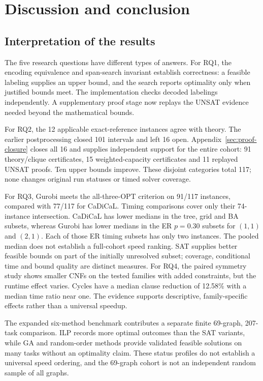 \section{Discussion and conclusion}
\subsection{Interpretation of the results}
The five research questions have different types of answers.
For RQ1, the encoding equivalence and span-search invariant establish
correctness: a feasible labeling supplies an upper bound, and the search
reports optimality only when justified bounds meet. The implementation
checks decoded labelings independently. A supplementary proof stage now
replays the UNSAT evidence needed beyond the mathematical bounds.

For RQ2, the 12 applicable exact-reference instances agree with theory.
The earlier postprocessing closed 101 intervals and left 16 open.
Appendix~\ref{sec:proof-closure} closes all 16 and supplies independent
support for the entire cohort: 91 theory/clique certificates, 15
weighted-capacity certificates and 11 replayed UNSAT proofs. Ten upper
bounds improve. These disjoint categories total 117; none changes
original run statuses or timed solver coverage.

For RQ3, Gurobi meets the all-three-OPT criterion on 91/117 instances,
compared with 77/117 for CaDiCaL. Timing comparisons cover only their
74-instance intersection. CaDiCaL has lower medians in the tree, grid
and BA subsets, whereas Gurobi has lower medians in the ER $p=0.30$
subsets for $(1,1)$ and $(2,1)$. Each of those ER timing subsets has
only two instances. The pooled median does not establish a full-cohort
speed ranking. SAT supplies better feasible bounds on part of the
initially unresolved subset; coverage, conditional time and bound
quality are distinct measures.
For RQ4, the paired symmetry study shows smaller CNFs on the tested
families with added constraints, but the runtime effect varies. Cycles
have a median clause reduction of 12.58\% with a median time ratio near
one. The evidence supports descriptive, family-specific effects rather
than a universal speedup.

The expanded six-method benchmark contributes a separate finite
69-graph, 207-task comparison. ILP records more optimal outcomes than
the SAT variants, while GA and random-order methods provide validated
feasible solutions on many tasks without an optimality claim. These
status profiles do not establish a universal speed ordering, and the
69-graph cohort is not an independent random sample of all graphs.

